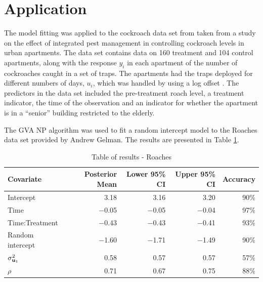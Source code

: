\documentclass{article}[12pt]
\begin{document}
\section{Application}
\label{sec:application}


The model fitting was applied to the cockroach data set from \cite{Gelman2007} taken from a study on the
effect of integrated pest management in controlling cockroach levels in urban apartments. The data set
contains data on 160 treatment and 104 control apartments, along with the response $y_i$ in each apartment of
the number of cockroaches caught in a set of traps. The apartments had the traps deployed for different
numbers of days, $u_i$, which was handled by using a log offset \cite{Agresti2002}. The predictors in the data
set included the pre-treatment roach level, a treatment indicator, the time of the observation and an
indicator for whether the apartment is in a ``senior'' building restricted to the elderly.

The GVA NP algorithm was used to fit a random intercept model to the Roaches data set provided by Andrew
Gelman. The results are presented in Table \ref{tab:application_roaches}.



\begin{table}
\caption{Table of results - Roaches}
\label{tab:application_roaches}
\begin{tabular}{|l|rrrr|}
\hline
Covariate & Posterior Mean & Lower 95\% CI & Upper 95\% CI & Accuracy \\
\hline
Intercept & 3.18 & 3.16 & 3.20 & 90\% \\
Time & $-$0.05 & $-$0.05 & $-$0.04 & 97\% \\
Time:Treatment & $-$0.43 & $-$0.43 & $-$0.41 & 93\% \\
Random intercept & $-$1.60 & $-$1.71 & $-$1.49 & 90\% \\
$\sigma^2_{{\bf u}_1}$ & 0.58 & 0.57 & 0.57 & 57\% \\
$\rho$ & 0.71 & 0.67 & 0.75 & 88\% \\
\hline
\end{tabular}
\end{table}
\end{document}
